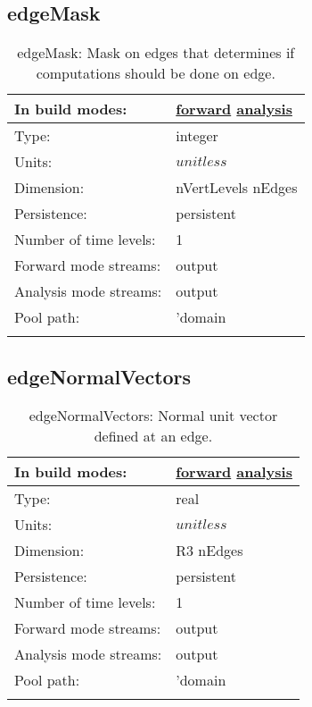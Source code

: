 \subsection[edgeMask]{edgeMask}
\label{subsec:var_sec_mesh_edgeMask}
\begin{center}
\begin{longtable}{| p{2.0in} | p{4.0in} |}
        \hline 
        In build modes: & \hyperref[subsec:forward_var_tab_mesh]{forward} \hyperref[subsec:analysis_var_tab_mesh]{analysis} \\
        \hline 
        Type: & integer \\
        \hline 
        Units: & $unitless$ \\
        \hline 
        Dimension: & nVertLevels nEdges \\
        \hline 
        Persistence: & persistent \\
        \hline 
        Number of time levels: & 1 \\
        \hline 
		 Forward mode streams: &  output \\
        \hline 
		 Analysis mode streams: &  output \\
        \hline 
            Pool path: & 'domain %
 \\
		 \hline 
    \caption{edgeMask: Mask on edges that determines if computations should be done on edge.}
\end{longtable}
\end{center}
\subsection[edgeNormalVectors]{edgeNormalVectors}
\label{subsec:var_sec_mesh_edgeNormalVectors}
\begin{center}
\begin{longtable}{| p{2.0in} | p{4.0in} |}
        \hline 
        In build modes: & \hyperref[subsec:forward_var_tab_mesh]{forward} \hyperref[subsec:analysis_var_tab_mesh]{analysis} \\
        \hline 
        Type: & real \\
        \hline 
        Units: & $unitless$ \\
        \hline 
        Dimension: & R3 nEdges \\
        \hline 
        Persistence: & persistent \\
        \hline 
        Number of time levels: & 1 \\
        \hline 
		 Forward mode streams: &  output \\
        \hline 
		 Analysis mode streams: &  output \\
        \hline 
            Pool path: & 'domain %
 \\
		 \hline 
    \caption{edgeNormalVectors: Normal unit vector defined at an edge.}
\end{longtable}
\end{center}
